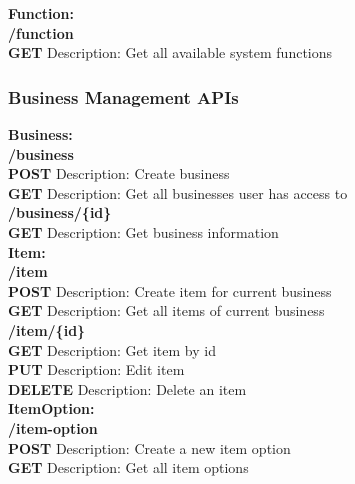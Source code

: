 \documentclass[11pt,a4paper,pdftex]{article}
\begin{document}
\textbf{Function:}\\
\hspace*{1em}\textbf{/function}\\
\hspace*{2em}\textbf{GET} Description: Get all available system functions\\


\subsubsection{Business Management APIs}
\textbf{Business:}\\
\hspace*{1em}\textbf{/business}\\
\hspace*{2em}\textbf{POST} Description: Create business\\
\hspace*{2em}\textbf{GET} Description: Get all businesses user has access to\\

\hspace*{1em}\textbf{/business/\{id\}}\\
\hspace*{2em}\textbf{GET} Description: Get business information\\

\textbf{Item:}\\
\hspace*{1em}\textbf{/item}\\
\hspace*{2em}\textbf{POST} Description: Create item for current business\\
\hspace*{2em}\textbf{GET} Description: Get all items of current business\\

\hspace*{1em}\textbf{/item/\{id\}}\\
\hspace*{2em}\textbf{GET} Description: Get item by id\\
\hspace*{2em}\textbf{PUT} Description: Edit item\\
\hspace*{2em}\textbf{DELETE} Description: Delete an item\\

\textbf{ItemOption:}\\
\hspace*{1em}\textbf{/item-option}\\
\hspace*{2em}\textbf{POST} Description: Create a new item option\\
\hspace*{2em}\textbf{GET} Description: Get all item options\\
\end{document}
